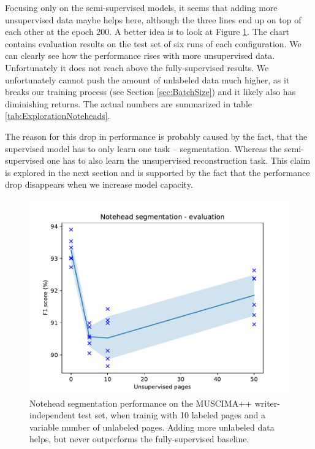 Focusing only on the semi-supervised models, it seems that adding more unsupervised data maybe helps here, although the three lines end up on top of each other at the epoch 200. A better idea is to look at Figure \ref{fig:ExplorationNoteheadsEvaluation}. The chart contains evaluation results on the test set of six runs of each configuration. We can clearly see how the performance rises with more unsupervised data. Unfortunately it does not reach above the fully-supervised results. We unfortunately cannot push the amount of unlabeled data much higher, as it breaks our training process (see Section \ref{sec:BatchSize}) and it likely also has diminishing returns. The actual numbers are summarized in table \ref{tab:ExplorationNoteheads}.

The reason for this drop in performance is probably caused by the fact, that the supervised model has to only learn one task -- segmentation. Whereas the semi-supervised one has to also learn the unsupervised reconstruction task. This claim is explored in the next section and is supported by the fact that the performance drop disappears when we increase model capacity.

\begin{figure}[ht]
    \centering
    \includegraphics[width=140mm]{../../figures/01-exploration-noteheads/noteheads-evaluation.pdf}
    \caption{Notehead segmentation performance on the MUSCIMA++ writer-independent test set, when trainig with 10 labeled pages and a variable number of unlabeled pages. Adding more unlabeled data helps, but never outperforms the fully-supervised baseline.}
    \label{fig:ExplorationNoteheadsEvaluation}
\end{figure}

